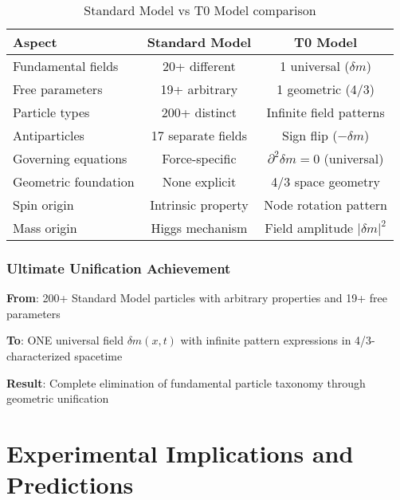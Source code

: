 \documentclass[12pt,a4paper]{article}
\newcommand{\deltafield}{\ensuremath{\delta m}}
\begin{document}
	\begin{table}[htbp]
		\centering
		\begin{tabular}{lcc}
			\toprule
			\textbf{Aspect} & \textbf{Standard Model} & \textbf{T0 Model} \\
			\midrule
			Fundamental fields & 20+ different & 1 universal ($\deltafield$) \\
			Free parameters & 19+ arbitrary & 1 geometric (4/3) \\
			Particle types & 200+ distinct & Infinite field patterns \\
			Antiparticles & 17 separate fields & Sign flip ($-\deltafield$) \\
			Governing equations & Force-specific & $\partial^2\deltafield = 0$ (universal) \\
			Geometric foundation & None explicit & 4/3 space geometry \\
			Spin origin & Intrinsic property & Node rotation pattern \\
			Mass origin & Higgs mechanism & Field amplitude $|\deltafield|^2$ \\
			\bottomrule
		\end{tabular}
		\caption{Standard Model vs T0 Model comparison}
		\label{tab:detailed_comparison}
	\end{table}
	
	\subsubsection{Ultimate Unification Achievement}
	\label{subsubsec:ultimate_unification}
	
	\begin{tcolorbox}[colback=green!5!white,colframe=green!75!black,title=T0 Unification Achievement]
		\textbf{From}: 200+ Standard Model particles with arbitrary properties and 19+ free parameters
		
		\textbf{To}: ONE universal field $\deltafield(x,t)$ with infinite pattern expressions in 4/3-characterized spacetime
		
		\textbf{Result}: Complete elimination of fundamental particle taxonomy through geometric unification
	\end{tcolorbox}
	
	\section{Experimental Implications and Predictions}
	\label{sec:experimental_implications}
	
\end{document}
